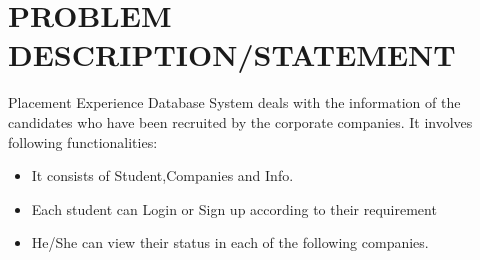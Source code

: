 \section{PROBLEM DESCRIPTION/STATEMENT}
Placement Experience Database System deals with the information of the candidates who have been recruited by the corporate companies.
It involves following functionalities:
\begin{itemize}
    \item It consists of Student,Companies and Info.
    \item Each student can Login or Sign up according to their requirement
    \item He/She can view their status in each of the following companies.
\end{itemize}